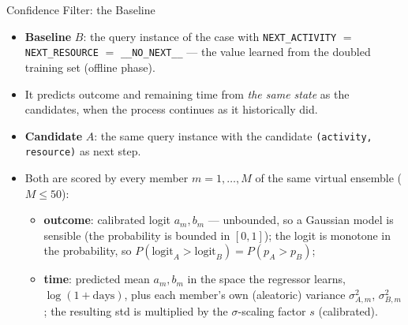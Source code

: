 \documentclass[aspectratio=169]{beamer} %
\begin{document}
\begin{frame}{Confidence Filter: the Baseline}
  \small
  \begin{itemize}
    \item \textbf{Baseline} $B$: the query instance of the case with
      \texttt{NEXT\_ACTIVITY} $=$ \texttt{NEXT\_RESOURCE} $=$ \texttt{\_\_NO\_NEXT\_\_}
      --- the value learned from the doubled training set (offline phase).
    \item It predicts outcome and remaining time from \emph{the same state} as the
      candidates, when the process continues as it historically did.
    \item \textbf{Candidate} $A$: the same query instance with the candidate
      \texttt{(activity, resource)} as next step.
    \item Both are scored by \alert{every member} $m = 1,\dots,M$ of the same
      virtual ensemble ($M \le 50$):
      \begin{itemize}
        \item \textbf{outcome}: calibrated \alert{logit} $a_m, b_m$ --- unbounded,
          so a Gaussian model is sensible (the probability is bounded in $[0,1]$);
          the logit is monotone in the probability, so $P(\text{logit}_A >
          \text{logit}_B) = P(p_A > p_B)$;
        \item \textbf{time}: predicted mean $a_m, b_m$ in the space the regressor learns, $\log(1+\text{days})$, plus each member's own (aleatoric) variance $\sigma^2_{A,m}$, $\sigma^2_{B,m}$; the resulting std is multiplied by the $\sigma$-scaling factor $s$ (calibrated).

      \end{itemize}
  \end{itemize}
\end{frame}
\end{document}
